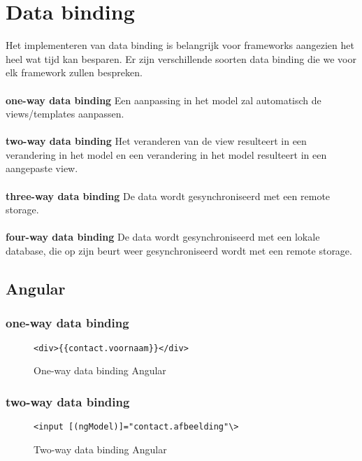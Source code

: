 \section{Data binding}
Het implementeren van data binding is belangrijk voor frameworks aangezien het heel wat tijd kan besparen. Er zijn verschillende soorten data binding die we voor elk framework zullen bespreken.
\\  \\
\textbf{one-way data binding} \hspace{1cm} Een aanpassing in het model zal automatisch de views/templates aanpassen.
\\ \\
\textbf{two-way data binding} \hspace{1cm} Het veranderen van de view resulteert in een verandering in het model en een verandering in het model resulteert in een aangepaste view. 
\\ \\
\textbf{three-way data binding} \hspace{1cm} De data wordt gesynchroniseerd met een  remote storage. 
\\ \\
\textbf{four-way data binding} \hspace{1cm} De data wordt gesynchroniseerd met een  lokale database, die op zijn beurt weer gesynchroniseerd wordt met een remote storage.

\subsection{Angular}

\subsubsection{one-way data binding}
\begin{figure}[H]
\begin{lstlisting}
<div>{{contact.voornaam}}</div>
\end{lstlisting}
\caption{One-way data binding Angular}
\end{figure}
\subsubsection{two-way data binding}

\begin{figure}[H]
\begin{lstlisting}
<input [(ngModel)]="contact.afbeelding"\>
\end{lstlisting}
\caption{Two-way data binding Angular}
\end{figure}

